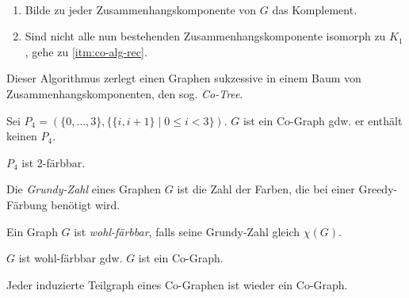 \begin{definition}~\par
    \begin{enumerate}
        \item \label{itm:co-alg-rec}
        Bilde zu jeder Zusammenhangskomponente von $ G $ das Komplement.
        \item Sind nicht alle nun bestehenden Zusammenhangskomponente isomorph zu $ K_1 $, gehe zu \ref{itm:co-alg-rec}.
    \end{enumerate}

    Dieser Algorithmus zerlegt einen Graphen sukzessive in einem Baum von Zusammenhangskomponenten, den sog. \textit{Co-Tree}.
\end{definition}

\begin{proposition}
    Sei $ P_4 = (\{ 0, \dots, 3 \}, \{ \{ i, i + 1\} \mid 0 \leq i < 3 \}) $.
    $ G $ ist ein Co-Graph gdw. er enthält keinen $ P_4 $.
\end{proposition}

\begin{proposition}
    $ P_4 $ ist 2-färbbar.
\end{proposition}

\begin{definition}
    Die \textit{Grundy-Zahl} eines Graphen $ G $ ist die Zahl der Farben, die bei einer Greedy-Färbung benötigt wird.
\end{definition}

\begin{definition}
    Ein Graph $ G $ ist \textit{wohl-färbbar}, falls seine Grundy-Zahl gleich $ \chi(G) $.
\end{definition}

\begin{proposition}
    $ G $ ist wohl-färbbar gdw. $ G $ ist ein Co-Graph.
\end{proposition}

\begin{proposition}
    Jeder induzierte Teilgraph eines Co-Graphen ist wieder ein Co-Graph.
\end{proposition}
